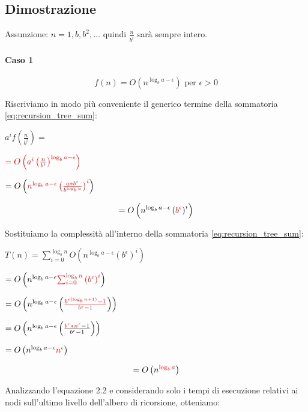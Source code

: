 \subsection{Dimostrazione}

Assunzione: $n = 1, b,b^2,\ldots$ quindi $\frac{n}{b^i}$ sarà sempre intero.

\paragraph{Caso 1}

\begin{equation}
f(n) = O(n^{\log_b{a} - \epsilon}) \mbox{ per } \epsilon > 0
\end{equation}

Riscriviamo in modo più conveniente il generico termine della sommatoria \ref{eq:recursion_tree_sum}:

$a^if\left(\frac{n}{b^i}\right)=$

$\textcolor{red}{=O\left(a^i\left(\frac{n}{b^i}\right)^{\log_b{a}-\epsilon}\right)}$

$= O\left(\textcolor{red}{n^{\log_b{a}-\epsilon}\left(\frac{a*b^\epsilon}{b^{\log_b{a}}}\right)^i}\right)$

\begin{equation}
= O\left(n^{\log_b{a}-\epsilon}\left(\textcolor{red}{b^\epsilon}\right)^i\right)
\end{equation}

Sostituiamo la complessità all'interno della sommatoria \ref{eq:recursion_tree_sum}:

$T(n) = \sum_{i=0}^{\log_b{n}}{O\left(n^{\log_b{a-\epsilon}}\left(b^\epsilon\right)^i\right)}$

$=O\left(n^{\log_b{a-\epsilon}}\textcolor{red}{\sum_{i=0}^{\log_b{n}}{(b^\epsilon)}^i}\right)$

$=O\left(n^{\log_b{a-\epsilon}}\left(\textcolor{red}{\frac{b^{\epsilon( \log_b{n}+1)}-1}{b^\epsilon-1}}\right)\right)$

$=O\left(n^{\log_b{a-\epsilon}}\left(\frac{\textcolor{red}{b^\epsilon * n^\epsilon} - 1}{b^\epsilon-1}\right)\right)$

$=O\left(n^{\log_b{a-\epsilon}}\textcolor{red}{n^\epsilon}\right)$

\begin{equation}
= O\left(n^{\textcolor{red}{\log_b{a}}}\right)
\end{equation}

Analizzando l'equazione 2.2 e considerando solo i tempi di esecuzione relativi ai nodi sull'ultimo livello dell'albero di ricorsione, otteniamo:

